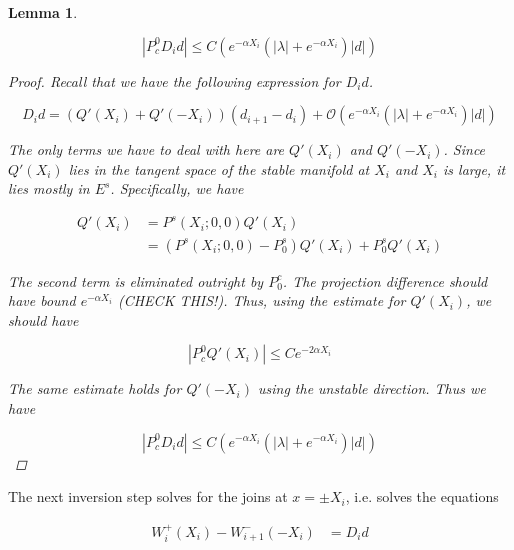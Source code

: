 \documentclass[12pt]{article}
\newtheorem{lemma}{Lemma}
\begin{document}
\begin{lemma}\label{P0cDid}

\begin{equation}
|P^0_c D_i d| \leq C \left( e^{-\alpha X_i} \left( |\lambda| +  e^{-\alpha X_i}  \right) |d| \right)
\end{equation}

\begin{proof}
Recall that we have the following expression for $D_i d$.

\[
D_i d = ( Q'(X_i) + Q'(-X_i))(d_{i+1} - d_i ) + \mathcal{O} \left( e^{-\alpha X_i} \left( |\lambda| +  e^{-\alpha X_i}  \right) |d| \right)
\]

The only terms we have to deal with here are $Q'(X_i)$ and $Q'(-X_i)$. Since $Q'(X_i)$ lies in the tangent space of the stable manifold at $X_i$ and $X_i$ is large, it lies mostly in $E^s$. Specifically, we have

\begin{align*}
Q'(X_i) &= P^s(X_i; 0, 0) Q'(X_i) \\
&= (P^s(X_i; 0, 0) - P^s_0) Q'(X_i) + P^s_0 Q'(X_i)
\end{align*}

The second term is eliminated outright by $P^c_0$. The projection difference should have bound $e^{-\alpha X_i}$ (CHECK THIS!). Thus, using the estimate for $Q'(X_i)$, we should have

\[
| P^0_c Q'(X_i)| \leq C e^{-2 \alpha X_i}
\]

The same estimate holds for $Q'(-X_i)$ using the unstable direction. Thus we have

\[
|P^0_c D_i d| \leq C \left( e^{-\alpha X_i} \left( |\lambda| +  e^{-\alpha X_i}  \right) |d| \right)
\]

\end{proof}
\end{lemma}

The next inversion step solves for the joins at $x = \pm X_i$, i.e. solves the equations

\begin{align*}
W_i^+(X_i) - W_{i+1}^-(-X_i) &= D_i d \\
\end{align*}

\end{document}
